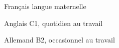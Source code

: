 

\begin{cvpairs}

  
\cvpair
    {Français} %
    {langue maternelle} %


\cvpair
    {Anglais} %
    {C1, quotidien au travail} %


\cvpair
    {Allemand} %
    {B2, occasionnel au travail} %

\end{cvpairs}